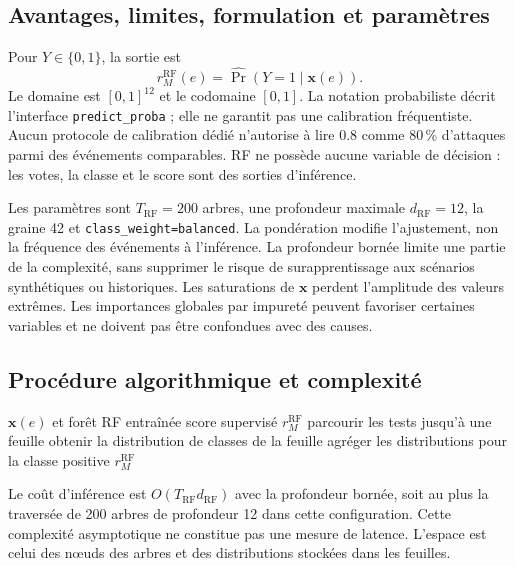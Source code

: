 \documentclass[11pt,a4paper,oneside]{report}
\theoremstyle{definition}
\theoremstyle{plain}
\begin{document}
\subsection*{Avantages, limites, formulation et paramètres}

Pour $Y\in\{0,1\}$, la sortie est
\begin{equation}
r_M^{\mathrm{RF}}(e)=\widehat{\Pr}(Y=1\mid\mathbf{x}(e)).
\label{eq:ai-ro-rf}
\end{equation}
Le domaine est $[0,1]^{12}$ et le codomaine $[0,1]$. La notation probabiliste décrit l'interface \texttt{predict\_proba} ; elle ne garantit pas une calibration fréquentiste. Aucun protocole de calibration dédié n'autorise à lire $0.8$ comme 80\,\% d'attaques parmi des événements comparables. RF ne possède aucune variable de décision : les votes, la classe et le score sont des sorties d'inférence.

Les paramètres sont $T_{\mathrm{RF}}=200$ arbres, une profondeur maximale
$d_{\mathrm{RF}}=12$, la graine 42 et \texttt{class\_weight=balanced}. La pondération modifie l'ajustement, non la fréquence des événements à l'inférence. La profondeur bornée limite une partie de la complexité, sans supprimer le risque de surapprentissage aux scénarios synthétiques ou historiques. Les saturations de $\mathbf{x}$ perdent l'amplitude des valeurs extrêmes. Les importances globales par impureté peuvent favoriser certaines variables et ne doivent pas être confondues avec des causes.

\subsection*{Procédure algorithmique et complexité}

\begin{algorithm}[H]
\caption{Inférence supervisée par forêt aléatoire}
\label{alg:ai-ro-rf}
\begin{algorithmic}[1]
\Require $\mathbf{x}(e)$ et forêt RF entraînée
\Ensure score supervisé $r_M^{\mathrm{RF}}$
  \State parcourir les tests jusqu'à une feuille
  \State obtenir la distribution de classes de la feuille
\EndFor
\State agréger les distributions pour la classe positive
\State \Return $r_M^{\mathrm{RF}}$
\end{algorithmic}
\end{algorithm}

Le coût d'inférence est $O(T_{\mathrm{RF}}d_{\mathrm{RF}})$ avec la profondeur bornée, soit au plus la traversée de 200 arbres de profondeur 12 dans cette configuration. Cette complexité asymptotique ne constitue pas une mesure de latence. L'espace est celui des nœuds des arbres et des distributions stockées dans les feuilles.
\end{document}
